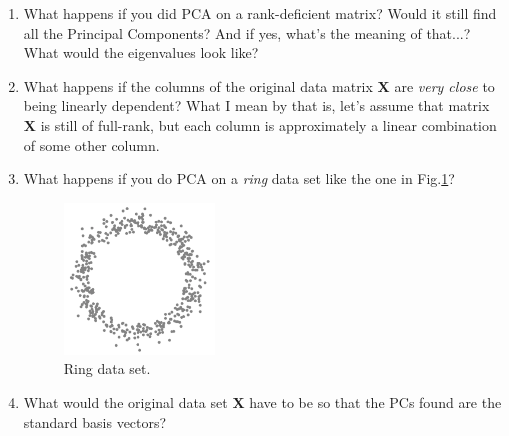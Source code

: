 \documentclass[10pt,twocolumn]{article}
\begin{document}
\begin{enumerate}
\item What happens if you did PCA on a rank-deficient matrix? Would it still find all the Principal Components? And if yes, what's the meaning of that...? What would the eigenvalues look like?
\item What happens if the columns of the original data matrix $\bm{X}$ are \textit{very close} to being linearly dependent? What I mean by that is, let's assume that matrix $\bm{X}$ is still of full-rank, but each column is approximately a linear combination of some other column.
\item What happens if you do PCA on a \textit{ring} data set like the one in Fig.\ref{fig:ring-data-set}?
\begin{figure}[H]
\centering\includegraphics[width=4cm]{ring-data-set.png}
\caption{Ring data set.}
\label{fig:ring-data-set}
\end{figure}
\item What would the original data set $\bm{X}$ have to be so that the PCs found are the standard basis vectors?
\end{enumerate}






\thebibliography{}
\end{document}
